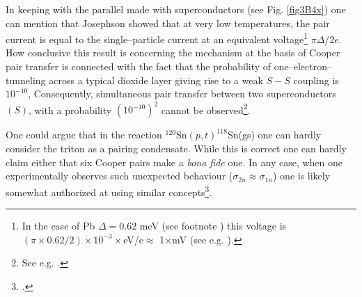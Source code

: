 \begin{subappendices}
In keeping with the parallel made with superconductors (see Fig. \ref{fig3B4x}) one can mention that Josephson showed that at very low temperatures, the pair current is equal to the single--particle current at an equivalent voltage\footnote{In the case of Pb $\Delta=0.62$ meV (see footnote \footnotemark[\ref{foot75}]) this voltage is $(\pi\times0.62/2)\times 10^{-3}\times$eV/e$\approx$ 1$\times$mV (see e.g. \cite{McDonald:01}).} $\pi\Delta/2e$. How conclusive this result is concerning the mechanism at the basis of Cooper pair transfer is connected with the fact that the probability of one--electron--tunneling across a typical dioxide layer giving rise to a weak $S-S$ coupling is $10^{-10}$, Consequently, simultaneous pair transfer between two superconductors $(S)$, with a probability  $(10^{-10})^2$ cannot be observed\footnote{See e.g. \cite{McDonald:01}.}.


One could argue that in the reaction $^{120}$Sn$(p,t)^{118}$Sn(gs) one can hardly consider the triton as a pairing condensate. While this is correct one can hardly claim either that six Cooper pairs make a \textit{bona fide} one. In any case, when one experimentally observes such unexpected behaviour ($\sigma_{2n}\approx\sigma_{1n}$) one is likely somewhat authorized at using similar concepts\footnote{\cite{Anderson:72}.}.

\end{subappendices}

